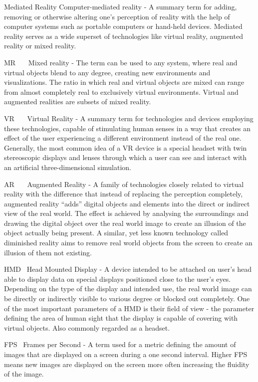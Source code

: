 \documentclass[12pt, a4paper]{article}
\newenvironment{definitions}
{\begin{description}[style=nextline]}
{\end{description}}
\begin{document}
\begin{definitions}
	\item[Mediated Reality] Computer-mediated reality - A summary term for adding, removing or otherwise altering one’s perception of reality with the help of computer systems such as portable computers or hand-held devices. Mediated reality serves as a wide superset of technologies like virtual reality, augmented reality or mixed reality.
	\item[MR~~~] Mixed reality - The term can be used to any system, where real and virtual objects blend to any degree, creating new environments and visualizations. The ratio in which real and virtual objects are mixed can range from almost completely real to exclusively virtual environments. Virtual and augmented realities are subsets of mixed reality.
	\item[VR~~~] Virtual Reality - A summary term for technologies and devices employing these technologies, capable of stimulating human senses in a way that creates an effect of the user experiencing a different environment instead of the real one. Generally, the most common idea of a VR device is a special headset with twin stereoscopic displays and lenses through which a user can see and interact with an artificial three-dimensional simulation.
	\item[AR~~~] Augmented Reality - A family of technologies closely related to virtual reality with the difference that instead of replacing the perception completely, augmented reality “adds” digital objects and elements into the direct or indirect view of the real world. The effect is achieved by analysing the surroundings and drawing the digital object over the real world image to create an illusion of the object actually being present. A similar, yet less known technology called diminished reality aims to remove real world objects from the screen to create an illusion of them not existing.
	\item[HMD~] Head Mounted Display - A device intended to be attached on user’s head able to display data on special displays positioned close to the user’s eyes. Depending on the type of the display and intended use, the real world image can be directly or indirectly visible to various degree or blocked out completely. One of the most important parameters of a HMD is their field of view - the parameter defining the area of human sight that the display is capable of covering with virtual objects. Also commonly regarded as a headset.
	\item[FPS~] Frames per Second - A term used for a metric defining the amount of images that are displayed on a screen during a one second interval. Higher FPS means new images are displayed on the screen more often increasing the fluidity of the image.

\end{definitions}
\end{document}
